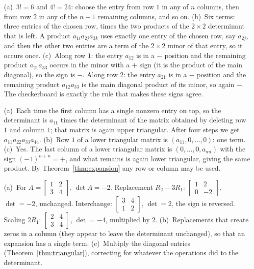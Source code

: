 \documentclass[11pt]{article}
\begin{document}
\begin{description}[leftmargin=0pt,itemsep=5pt]
  \item[Pause and think \ref{think:otherrow}.] (a)~$3!=6$ and $4!=24$: choose the entry from row $1$ in any of $n$ columns, then from row $2$ in any of the $n-1$ remaining columns, and so on. (b)~Six terms: three entries of the chosen row, times the two products of the $2\times2$ determinant that is left. A product $a_{1i}a_{2j}a_{3k}$ uses exactly one entry of the chosen row, say $a_{2j}$, and then the other two entries are a term of the $2\times2$ minor of that entry, so it occurs once. (c)~Along row $1$: the entry $a_{12}$ is in a $-$ position and the remaining product $a_{21}a_{33}$ occurs in the minor with a $+$ sign (it is the product of the main diagonal), so the sign is $-$. Along row $2$: the entry $a_{21}$ is in a $-$ position and the remaining product $a_{12}a_{33}$ is the main diagonal product of its minor, so again $-$. The checkerboard is exactly the rule that makes these signs agree.
  \item[Pause and think \ref{think:triprod}.] (a)~Each time the first column has a single nonzero entry on top, so the determinant is $a_{11}$ times the determinant of the matrix obtained by deleting row $1$ and column $1$; that matrix is again upper triangular. After four steps we get $a_{11}a_{22}a_{33}a_{44}$. (b)~Row $1$ of a lower triangular matrix is $(a_{11},0,\dots,0)$: one term. (c)~Yes. The last column of a lower triangular matrix is $(0,\dots,0,a_{nn})$ with the sign $(-1)^{n+n}=+$, and what remains is again lower triangular, giving the same product. By Theorem~\ref{thm:expansion} any row or column may be used.
  \item[Pause and think \ref{think:faster}.] (a)~For $A=\begin{bmatrix}1&2\\3&4\end{bmatrix}$, $\det A=-2$. Replacement $R_2-3R_1$: $\begin{bmatrix}1&2\\0&-2\end{bmatrix}$, $\det=-2$, unchanged. Interchange: $\begin{bmatrix}3&4\\1&2\end{bmatrix}$, $\det=2$, the sign is reversed. Scaling $2R_1$: $\begin{bmatrix}2&4\\3&4\end{bmatrix}$, $\det=-4$, multiplied by $2$. (b)~Replacements that create zeros in a column (they appear to leave the determinant unchanged), so that an expansion has a single term. (c)~Multiply the diagonal entries (Theorem~\ref{thm:triangular}), correcting for whatever the operations did to the determinant.

\end{description}
\end{document}
